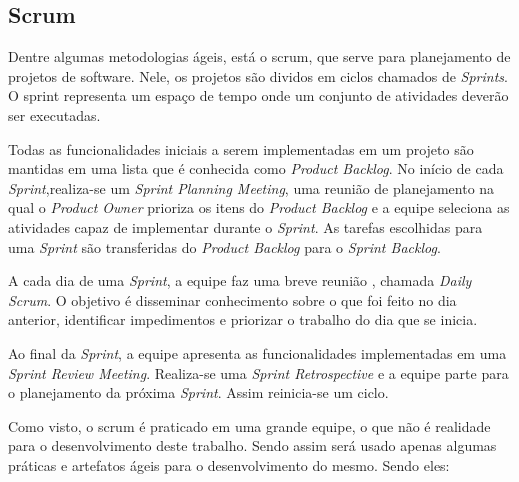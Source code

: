 \subsection{Scrum}
\label{Sec:Scrum}
  Dentre algumas metodologias ágeis, está o scrum, que serve para planejamento
de projetos de software. Nele, os projetos são dividos em ciclos chamados de 
\textit{Sprints}. O sprint representa um espaço de tempo onde um conjunto de 
atividades deverão ser executadas.

  Todas as funcionalidades iniciais a serem implementadas em um projeto são 
mantidas em uma lista que é conhecida como \textit{Product Backlog}. 
No início de cada	\textit{Sprint},realiza-se um  \textit{	Sprint Planning Meeting}, 
uma reunião de planejamento na qual o \textit{Product Owner} prioriza os itens 
do \textit{Product Backlog} e a equipe seleciona as atividades capaz de 
implementar durante o \textit{Sprint}. As tarefas escolhidas para uma 
\textit{Sprint} são transferidas do \textit{Product Backlog} para o
\textit{Sprint Backlog}.

  A cada dia de uma \textit{Sprint}, a equipe faz uma breve reunião , chamada 
\textit{Daily Scrum}. O objetivo é disseminar conhecimento sobre o que 
foi feito no dia anterior, identificar impedimentos e priorizar o trabalho do 
dia que se inicia.

  Ao final da \textit{Sprint}, a equipe apresenta as funcionalidades implementadas em 
uma \textit{Sprint Review Meeting}. Realiza-se uma \textit{Sprint Retrospective}
 e a equipe parte para o planejamento da próxima \textit{Sprint}. 
Assim reinicia-se um ciclo. 

  Como visto, o scrum é praticado em uma grande equipe, o que não é realidade 
para o desenvolvimento deste trabalho. Sendo assim será usado apenas algumas 
práticas e artefatos ágeis para o desenvolvimento do mesmo. Sendo eles:

